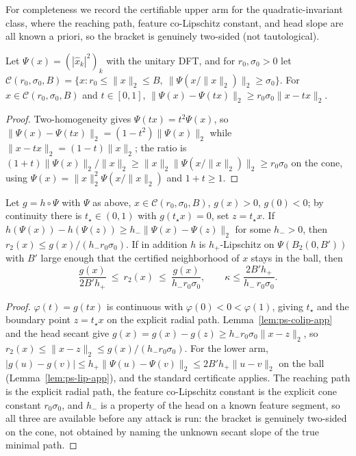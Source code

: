 For completeness we record the certifiable upper arm for the quadratic-invariant
class, where the reaching path, feature co-Lipschitz constant, and head slope are
all known a priori, so the bracket is genuinely two-sided (not tautological).

\begin{lemma}\label{lem:ps-colip-app}
Let $\Psi(x)=(|\hat x_k|^2)_k$ with the unitary DFT, and for $r_0,\sigma_0>0$ let
$\mathcal C(r_0,\sigma_0,B)=\{x:r_0\le\lVert x\rVert_2\le B,\ \lVert\Psi(x/\lVert x\rVert_2)\rVert_2\ge\sigma_0\}$.
For $x\in\mathcal C(r_0,\sigma_0,B)$ and $t\in[0,1]$,
$\lVert\Psi(x)-\Psi(tx)\rVert_2\ge r_0\sigma_0\lVert x-tx\rVert_2$.
\end{lemma}
\begin{proof}
Two-homogeneity gives $\Psi(tx)=t^2\Psi(x)$, so
$\lVert\Psi(x)-\Psi(tx)\rVert_2=(1-t^2)\lVert\Psi(x)\rVert_2$ while
$\lVert x-tx\rVert_2=(1-t)\lVert x\rVert_2$; the ratio is
$(1+t)\lVert\Psi(x)\rVert_2/\lVert x\rVert_2\ge\lVert x\rVert_2\lVert\Psi(x/\lVert x\rVert_2)\rVert_2\ge r_0\sigma_0$
on the cone, using $\Psi(x)=\lVert x\rVert_2^2\Psi(x/\lVert x\rVert_2)$ and
$1+t\ge1$.
\end{proof}

\begin{proposition}\label{prop:ps-alpha-app}
Let $g=h\circ\Psi$ with $\Psi$ as above, $x\in\mathcal C(r_0,\sigma_0,B)$,
$g(x)>0$, $g(0)<0$; by continuity there is $t_\star\in(0,1)$ with
$g(t_\star x)=0$, set $z=t_\star x$. If
$h(\Psi(x))-h(\Psi(z))\ge h_-\lVert\Psi(x)-\Psi(z)\rVert_2$ for some $h_->0$,
then $r_2(x)\le g(x)/(h_-r_0\sigma_0)$. If in addition $h$ is $h_+$-Lipschitz on
$\Psi(B_2(0,B'))$ with $B'$ large enough that the certified neighborhood of $x$
stays in the ball, then
\[
\frac{g(x)}{2B'h_+}\ \le\ r_2(x)\ \le\ \frac{g(x)}{h_-r_0\sigma_0},
\qquad \kappa\le\frac{2B'h_+}{h_-\,r_0\sigma_0}.
\]
\end{proposition}
\begin{proof}
$\varphi(t)=g(tx)$ is continuous with $\varphi(0)<0<\varphi(1)$, giving
$t_\star$ and the boundary point $z=t_\star x$ on the explicit radial path.
Lemma~\ref{lem:ps-colip-app} and the head secant give
$g(x)=g(x)-g(z)\ge h_-r_0\sigma_0\lVert x-z\rVert_2$, so
$r_2(x)\le\lVert x-z\rVert_2\le g(x)/(h_-r_0\sigma_0)$. For the lower arm,
$|g(u)-g(v)|\le h_+\lVert\Psi(u)-\Psi(v)\rVert_2\le2B'h_+\lVert u-v\rVert_2$ on
the ball (Lemma~\ref{lem:ps-lip-app}), and the standard certificate applies. The
reaching path is the explicit radial path, the feature co-Lipschitz constant is
the explicit cone constant $r_0\sigma_0$, and $h_-$ is a property of the head on
a known feature segment, so all three are available before any attack is run: the
bracket is genuinely two-sided on the cone, not obtained by naming the unknown
secant slope of the true minimal path.
\end{proof}

